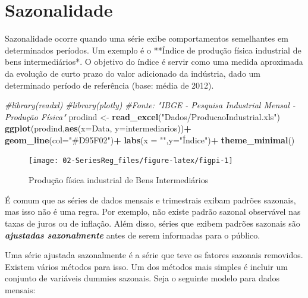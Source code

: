 \documentclass[
]{book}
\newenvironment{Shaded}{\begin{snugshade}}{\end{snugshade}}
\newcommand{\CommentTok}[1]{\textcolor[rgb]{0.56,0.35,0.01}{\textit{#1}}}
\newcommand{\DataTypeTok}[1]{\textcolor[rgb]{0.13,0.29,0.53}{#1}}
\newcommand{\KeywordTok}[1]{\textcolor[rgb]{0.13,0.29,0.53}{\textbf{#1}}}
\newcommand{\NormalTok}[1]{#1}
\newcommand{\OperatorTok}[1]{\textcolor[rgb]{0.81,0.36,0.00}{\textbf{#1}}}
\newcommand{\StringTok}[1]{\textcolor[rgb]{0.31,0.60,0.02}{#1}}
\theoremstyle{definition}
\theoremstyle{definition}
\theoremstyle{definition}
\theoremstyle{remark}
\begin{document}
\hypertarget{sazonalidade}{%
\section{Sazonalidade}\label{sazonalidade}}

Sazonalidade ocorre quando uma série exibe comportamentos semelhantes em determinados períodos. Um exemplo é o **Índice de produção física industrial de bens intermediários*. O objetivo do índice é servir como uma medida aproximada da evolução de curto prazo do valor adicionado da indústria, dado um determinado período de referência (base: média de 2012).

\begin{Shaded}
\begin{Highlighting}[]
\CommentTok{#library(readxl)}
\CommentTok{#library(plotly)}
\CommentTok{#Fonte: "IBGE - Pesquisa Industrial Mensal - Produção Física"}
\NormalTok{prodind <-}\StringTok{ }\KeywordTok{read_excel}\NormalTok{(}\StringTok{"Dados/ProducaoIndustrial.xls"}\NormalTok{)}
\KeywordTok{ggplot}\NormalTok{(prodind,}\KeywordTok{aes}\NormalTok{(}\DataTypeTok{x=}\NormalTok{Data, }\DataTypeTok{y=}\NormalTok{intermediarios))}\OperatorTok{+}
\StringTok{  }\KeywordTok{geom_line}\NormalTok{(}\DataTypeTok{col=}\StringTok{"#D95F02"}\NormalTok{)}\OperatorTok{+}
\StringTok{  }\KeywordTok{labs}\NormalTok{(}\DataTypeTok{x =} \StringTok{""}\NormalTok{,}\DataTypeTok{y=}\StringTok{"Índice"}\NormalTok{)}\OperatorTok{+}
\StringTok{  }\KeywordTok{theme_minimal}\NormalTok{()}
\end{Highlighting}
\end{Shaded}

\begin{figure}

{\centering \texttt{[image: 02-SeriesReg\_files/figure-latex/figpi-1]} 

}

\caption{Produção física industrial de Bens Intermediários}\label{fig:figpi}
\end{figure}

É comum que as séries de dados mensais e trimestrais exibam padrões sazonais, mas isso não é uma regra. Por exemplo, não existe padrão sazonal observável nas taxas de juros ou de inflação. Além disso, séries que exibem padrões sazonais são \textbf{\emph{ajustadas sazonalmente}} antes de serem informadas para o público.

Uma série ajustada sazonalmente é a série que teve os fatores sazonais removidos. Existem vários métodos para isso. Um dos métodos mais simples é incluir um conjunto de variáveis dummies sazonais. Seja o seguinte modelo para dados mensais:
\end{document}
